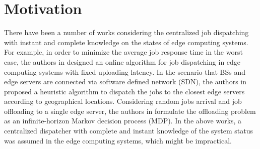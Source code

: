 
\section{Motivation}
\label{sec:review}

There have been a number of works considering the centralized job dispatching with instant and complete knowledge on the states of edge computing systems.
For example, in order to minimize the average job response time in the worst case, the authors in \cite{tan-online} designed an online algorithm for job dispatching in edge computing systems with fixed uploading latency.
In the scenario that BSs and edge servers are connected via software defined network (SDN), the authors in \cite{IOTJ18-FanQ} proposed a heuristic algorithm to dispatch the jobs to the closest edge servers according to geographical locations.
Considering random jobs arrival and job offloading to a single edge server, the authors in \cite{mdp-globecom,mdp-tvt} formulate the offloading problem as an infinite-horizon Markov decision process (MDP).
In the above works, a centralized dispatcher with complete and instant knowledge of the system status was assumed in the edge computing systems, which might be impractical.

